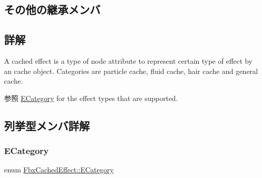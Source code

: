 \subsection*{その他の継承メンバ}


\subsection{詳解}
A cached effect is a type of node attribute to represent certain type of effect by an cache object. Categories are particle cache, fluid cache, hair cache and general cache. \begin{DoxySeeAlso}{参照}
\hyperlink{class_fbx_cached_effect_ab402402f3e66d6e31eb3002b0bd58c33}{E\+Category} for the effect types that are supported. 
\end{DoxySeeAlso}


\subsection{列挙型メンバ詳解}
\mbox{\label{class_fbx_cached_effect_ab402402f3e66d6e31eb3002b0bd58c33}} 
\subsubsection{\texorpdfstring{E\+Category}{ECategory}}
{\footnotesize\ttfamily enum \hyperlink{class_fbx_cached_effect_ab402402f3e66d6e31eb3002b0bd58c33}{Fbx\+Cached\+Effect\+::\+E\+Category}}

